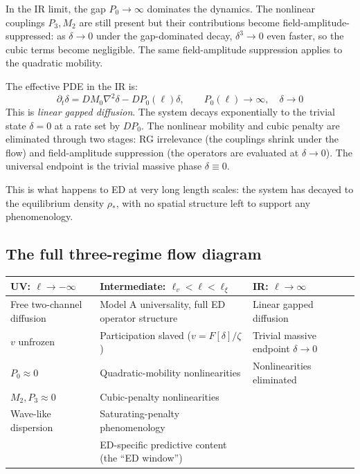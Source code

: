 \documentclass[11pt,a4paper]{article}
\begin{document}
In the IR limit, the gap $P_0 \to \infty$ dominates the dynamics. The nonlinear couplings $P_3, M_2$ are still present but their contributions become field-amplitude-suppressed: as $\delta \to 0$ under the gap-dominated decay, $\delta^3 \to 0$ even faster, so the cubic terms become negligible. The same field-amplitude suppression applies to the quadratic mobility.

The effective PDE in the IR is:
\[
\partial_t \delta = D M_0 \nabla^{2}\delta - D P_0(\ell) \delta, \qquad P_0(\ell) \to \infty, \quad \delta \to 0
\]
This is \emph{linear gapped diffusion}. The system decays exponentially to the trivial state $\delta = 0$ at a rate set by $D P_0$. The nonlinear mobility and cubic penalty are eliminated through two stages: RG irrelevance (the couplings shrink under the flow) and field-amplitude suppression (the operators are evaluated at $\delta \to 0$). The universal endpoint is the trivial massive phase $\delta \equiv 0$.

This is what happens to ED at very long length scales: the system has decayed to the equilibrium density $\rho_*$, with no spatial structure left to support any phenomenology.

\subsection{The full three-regime flow diagram}

\begin{center}
\begin{tabular}{p{} p{} p{}}
\hline
\textbf{UV: $\ell \to -\infty$} & \textbf{Intermediate: $\ell_v < \ell < \ell_\xi$} & \textbf{IR: $\ell \to \infty$} \\
\hline
Free two-channel diffusion & Model A universality, full ED operator structure & Linear gapped diffusion \\
$v$ unfrozen & Participation slaved ($v = F[\delta]/\zeta$) & Trivial massive endpoint $\delta \to 0$ \\
$P_0 \approx 0$ & Quadratic-mobility nonlinearities & Nonlinearities eliminated \\
$M_2, P_3 \approx 0$ & Cubic-penalty nonlinearities & \\
Wave-like dispersion & Saturating-penalty phenomenology & \\
& ED-specific predictive content (the ``ED window'') & \\
\hline
\end{tabular}
\end{center}
\end{document}
